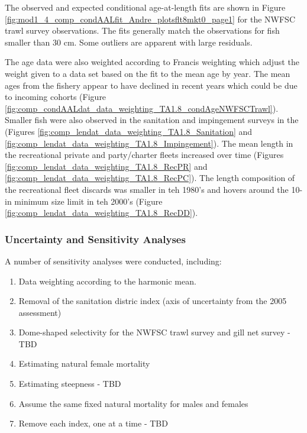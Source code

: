 \documentclass[12pt,]{article}
\begin{document}
The observed and expected conditional age-at-length fits are shown in
Figure \ref{fig:mod1_4_comp_condAALfit_Andre_plotsflt8mkt0_page1} for
the NWFSC trawl survey observations. The fits generally match the
observations for fish smaller than 30 cm. Some outliers are apparent
with large residuals.

The age data were also weighted according to Francis weighting which
adjust the weight given to a data set based on the fit to the mean age
by year. The mean ages from the fishery appear to have declined in
recent years which could be due to incoming cohorts (Figure
\ref{fig:comp_condAALdat_data_weighting_TA1.8_condAgeNWFSCTrawl}).\\
Smaller fish were also observed in the sanitation and impingement
surveys in the (Figures
\ref{fig:comp_lendat_data_weighting_TA1.8_Sanitation} and
\ref{fig:comp_lendat_data_weighting_TA1.8_Impingement}). The mean length
in the recreational private and party/charter fleets increased over time
(Figures \ref{fig:comp_lendat_data_weighting_TA1.8_RecPR} and
\ref{fig:comp_lendat_data_weighting_TA1.8_RecPC}). The length
composition of the recreational fleet discards was smaller in teh 1980's
and hovers around the 10-in minimum size limit in teh 2000's (Figure
\ref{fig:comp_lendat_data_weighting_TA1.8_RecDD}).

\subsubsection{Uncertainty and Sensitivity
Analyses}\label{uncertainty-and-sensitivity-analyses}

A number of sensitivity analyses were conducted, including:

\begin{enumerate}

  \item Data weighting according to the harmonic mean.
  
  \item Removal of the sanitation distric index (axis of uncertainty from the 2005 assessment)
  
  \item Dome-shaped selectivity for the NWFSC trawl survey and gill net survey - TBD
  
  \item Estimating natural female mortality
  
  \item Estimating steepness - TBD
  
  \item Assume the same fixed natural mortality for males and females
  
  \item Remove each index, one at a time - TBD
  
  
\end{enumerate}
\end{document}

